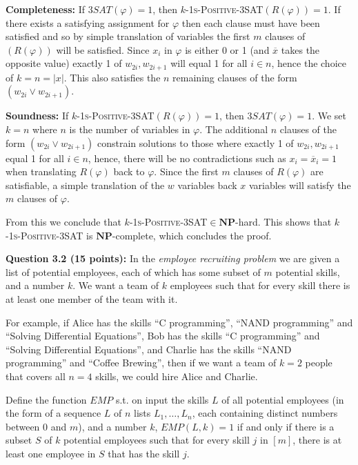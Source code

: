 \documentclass[11pt]{article}
\begin{document}
\textbf{Completeness:} If $3SAT(\varphi) = 1$, then \textsc{$k$-1s-Positive-3SAT}$(R(\varphi)) = 1$. If there exists a satisfying assignment for $\varphi$ then each clause must have been satisfied and so by simple translation of variables the first $m$ clauses of $(R(\varphi))$ will be satisfied. Since $x_i$ in $\varphi$ is either 0 or 1 (and $\overline{x}$ takes the opposite value) exactly 1 of $w_{2i}, w_{2i+1}$ will equal 1 for all $i \in n$, hence the choice of $k=n=|x|$. This also satisfies the $n$ remaining clauses of the form $(w_{2i} \lor w_{2i+1})$.

\textbf{Soundness:} If \textsc{$k$-1s-Positive-3SAT}$(R(\varphi)) = 1$, then $3SAT(\varphi) = 1$. We set $k=n$ where $n$ is the number of variables in $\varphi$. The additional $n$ clauses of the form $(w_{2i} \lor w_{2i+1})$ constrain solutions to those where exactly 1 of $w_{2i}, w_{2i+1}$ equal 1 for all $i \in n$, hence, there will be no contradictions such as $x_i = \overline{x}_i = 1$ when translating $R(\varphi)$ back to $\varphi$. Since the first $m$ clauses of $R(\varphi)$ are satisfiable, a simple translation of the $w$ variables back $x$ variables will satisfy the $m$ clauses of $\varphi$. 

From this we conclude that \textsc{$k$-1s-Positive-3SAT}$\in \mathbf{NP}$-hard. This shows that \textsc{$k$-1s-Positive-3SAT} is \(\mathbf{NP}\)-complete, which concludes the proof.

\newpage

\textbf{Question 3.2 (15 points):} In the \emph{employee recruiting
	problem} we are given a list of potential employees, each of which has
some subset of \(m\) potential skills, and a number \(k\). We want a team of \(k\) employees such that for every skill there is at least one member of the team with it.

For example, if Alice has the skills ``C programming'', ``NAND
programming'' and ``Solving Differential Equations'', Bob has the skills
``C programming'' and ``Solving Differential Equations'', and Charlie
has the skills ``NAND programming'' and ``Coffee Brewing'', then if we
want a team of $k=2$ people that covers all $n=4$ skills, we could hire
Alice and Charlie.

Define the function \(EMP\) s.t. on input the skills \(L\) of all
potential employees (in the form of a sequence \(L\) of \(n\) lists
\(L_1,\ldots,L_n\), each containing distinct numbers between \(0\) and
\(m\)), and a number \(k\), \(EMP(L,k)=1\) if and only if there is a
subset \(S\) of \(k\) potential employees such that for every skill
\(j\) in \([m]\), there is at least one employee in \(S\) that has the
skill \(j\).
\end{document}
